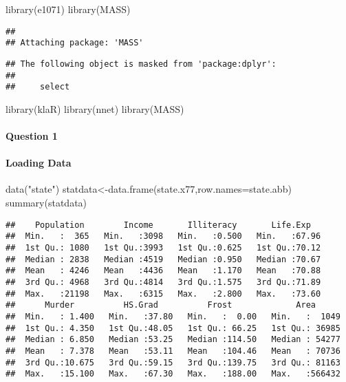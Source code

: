 \documentclass[
]{article}
\newenvironment{Shaded}{\begin{snugshade}}{\end{snugshade}}
\newcommand{\AttributeTok}[1]{\textcolor[rgb]{0.77,0.63,0.00}{#1}}
\newcommand{\FunctionTok}[1]{\textcolor[rgb]{0.00,0.00,0.00}{#1}}
\newcommand{\NormalTok}[1]{#1}
\newcommand{\OtherTok}[1]{\textcolor[rgb]{0.56,0.35,0.01}{#1}}
\newcommand{\StringTok}[1]{\textcolor[rgb]{0.31,0.60,0.02}{#1}}
\begin{document}
\begin{Shaded}
\begin{Highlighting}[]
\FunctionTok{library}\NormalTok{(e1071)}
\FunctionTok{library}\NormalTok{(MASS)}
\end{Highlighting}
\end{Shaded}

\begin{verbatim}
## 
## Attaching package: 'MASS'
\end{verbatim}

\begin{verbatim}
## The following object is masked from 'package:dplyr':
## 
##     select
\end{verbatim}

\begin{Shaded}
\begin{Highlighting}[]
\FunctionTok{library}\NormalTok{(klaR)}
\FunctionTok{library}\NormalTok{(nnet)}
\FunctionTok{library}\NormalTok{(MASS)}
\end{Highlighting}
\end{Shaded}

\hypertarget{question-1}{%
\paragraph{Question 1}\label{question-1}}

\hypertarget{loading-data}{%
\paragraph{Loading Data}\label{loading-data}}

\begin{Shaded}
\begin{Highlighting}[]
\FunctionTok{data}\NormalTok{(}\StringTok{"state"}\NormalTok{)}
\NormalTok{statdata}\OtherTok{\textless{}{-}}\FunctionTok{data.frame}\NormalTok{(state.x77,}\AttributeTok{row.names=}\NormalTok{state.abb)}
\FunctionTok{summary}\NormalTok{(statdata)}
\end{Highlighting}
\end{Shaded}

\begin{verbatim}
##    Population        Income       Illiteracy       Life.Exp    
##  Min.   :  365   Min.   :3098   Min.   :0.500   Min.   :67.96  
##  1st Qu.: 1080   1st Qu.:3993   1st Qu.:0.625   1st Qu.:70.12  
##  Median : 2838   Median :4519   Median :0.950   Median :70.67  
##  Mean   : 4246   Mean   :4436   Mean   :1.170   Mean   :70.88  
##  3rd Qu.: 4968   3rd Qu.:4814   3rd Qu.:1.575   3rd Qu.:71.89  
##  Max.   :21198   Max.   :6315   Max.   :2.800   Max.   :73.60  
##      Murder          HS.Grad          Frost             Area       
##  Min.   : 1.400   Min.   :37.80   Min.   :  0.00   Min.   :  1049  
##  1st Qu.: 4.350   1st Qu.:48.05   1st Qu.: 66.25   1st Qu.: 36985  
##  Median : 6.850   Median :53.25   Median :114.50   Median : 54277  
##  Mean   : 7.378   Mean   :53.11   Mean   :104.46   Mean   : 70736  
##  3rd Qu.:10.675   3rd Qu.:59.15   3rd Qu.:139.75   3rd Qu.: 81163  
##  Max.   :15.100   Max.   :67.30   Max.   :188.00   Max.   :566432
\end{verbatim}
\end{document}
